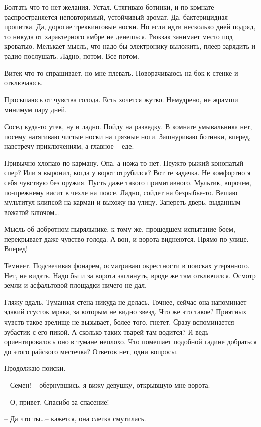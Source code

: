 \documentclass[a4paper]{book}
\begin{document}
Болтать что-то нет желания. Устал. Стягиваю ботинки, и по комнате распространяется неповторимый, устойчивый аромат. Да, бактерицидная пропитка. Да, дорогие треккинговые носки. Но если идти несколько дней подряд, то никуда от характерного амбре не денешься. Рюкзак занимает место под кроватью. Мелькает мысль, что надо бы электронику выложить, плеер зарядить и радио послушать. Ладно, потом. Все потом. 

Витек что-то спрашивает, но мне плевать. Поворачиваюсь на бок к стенке и отключаюсь.

Просыпаюсь от чувства голода. Есть хочется жутко. Немудрено, не жрамши минимум пару дней. 

Сосед куда-то утек, ну и ладно. Пойду на разведку. В комнате умывальника нет, посему натягиваю чистые носки на грязные ноги. Зашнуриваю ботинки, вперед, навстречу приключениям, а главное -- еде. 

Привычно хлопаю по карману. Опа, а ножа-то нет. Неужто рыжий-конопатый спер? Или я  выронил, когда у ворот отрубился? Вот те задачка. Не комфортно я себя чувствую без оружия. Пусть даже такого примитивного. Мультик, впрочем, по-прежнему висит в чехле на поясе. Ладно, сойдет на безрыбье-то. Вешаю мультитул клипсой на карман и выхожу на улицу. Запереть дверь, выданным вожатой ключом\ldots

Мысль об добротном пыряльнике, к тому же, прошедшем испытание боем, перекрывает даже чувство голода. А вон, и ворота виднеются. Прямо по улице. Вперед!

Темнеет. Подсвечивая фонарем, осматриваю окрестности в поисках утерянного. Нет, не видать. Надо бы и за ворота заглянуть, вроде же там отключился. Осмотр земли и асфальтовой площадки ничего не дал. 

Гляжу вдаль. Туманная стена никуда не делась. Точнее, сейчас она напоминает эдакий сгусток мрака, за которым не видно звезд. Что же это такое? Приятных чувств такое зрелище не вызывает, более того, гнетет. Сразу вспоминается зубастик с его пикой. А сколько таких тварей там водится? И ведь ориентировалось оно в тумане неплохо. Что помешает подобной гадине добраться до этого райского местечка? Ответов нет, одни вопросы.

Продолжаю поиски. 


-- Семен! -- обернувшись, я вижу девушку, открывшую мне ворота.

-- О, привет. Спасибо за спасение!

-- Да что ты\ldots -- кажется, она слегка смутилась. 
\end{document}
